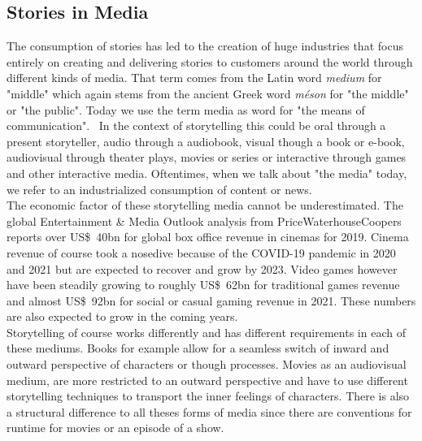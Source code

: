 \subsection{Stories in Media}
The consumption of stories has led to the creation of huge industries that focus entirely on creating and delivering stories to customers around the world through different kinds of media. That term comes from the Latin word \textit{medium} for "middle" which again stems from the ancient Greek word \textit{méson} for "the middle" or "the public". Today we use the term media as word for "the means of communication".~\cite{Hoffmann2000} In the context of storytelling this could be oral through a present storyteller, audio through a audiobook, visual though a book or e-book, audiovisual through theater plays, movies or series or interactive through games and other interactive media. Oftentimes, when we talk about "the media" today, we refer to an industrialized consumption of content or news.\\
The economic factor of these storytelling media cannot be underestimated. The global Entertainment \& Media Outlook analysis from PriceWaterhouseCoopers reports over US\$~40bn for global box office revenue in cinemas for 2019. Cinema revenue of course took a nosedive because of the COVID-19 pandemic in 2020 and 2021 but are expected to recover and grow by 2023. Video games however have been steadily growing to roughly US\$~62bn for traditional games revenue and almost US\$~92bn for social or casual gaming revenue in 2021. These numbers are also expected to grow in the coming years.~\cite{PwC2021}\\
Storytelling of course works differently and has different requirements in each of these mediums. Books for example allow for a seamless switch of inward and outward perspective of characters or though processes. Movies as an audiovisual medium, are more restricted to an outward perspective and have to use different storytelling techniques to transport the inner feelings of characters. There is also a structural difference to all theses forms of media since there are conventions for runtime for movies or an episode of a show.~\cite{Ryan2004}\\

